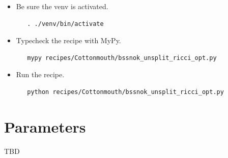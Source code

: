 \documentclass{article}
\begin{document}
\begin{itemize}
\item Be sure the venv is activated.
   \begin{verbatim}
   . ./venv/bin/activate
   \end{verbatim}

\item Typecheck the recipe with MyPy.
   \begin{verbatim}
   mypy recipes/Cottonmouth/bssnok_unsplit_ricci_opt.py
   \end{verbatim}

\item Run the recipe.
   \begin{verbatim}
   python recipes/Cottonmouth/bssnok_unsplit_ricci_opt.py
   \end{verbatim}
\end{itemize}

\section{Parameters}

TBD

\end{document}
